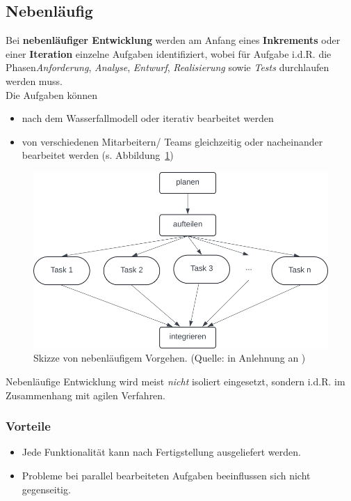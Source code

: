 \subsection{Nebenläufig}

\noindent
Bei \textbf{nebenläufiger Entwicklung} werden am Anfang eines \textbf{Inkrements} oder einer \textbf{Iteration} einzelne Aufgaben identifiziert, wobei für Aufgabe i.d.R. die Phasen\textit{Anforderung}, \textit{Analyse},  \textit{Entwurf}, \textit{Realisierung} sowie \textit{Tests} durchlaufen werden muss.\\
Die Aufgaben können
\begin{itemize}
    \item nach dem Wasserfallmodell oder iterativ bearbeitet werden
    \item von verschiedenen Mitarbeitern/ Teams gleichzeitig oder nacheinander bearbeitet werden (s. Abbildung~\ref{fig:nebenlaeufig})
\end{itemize}


\begin{figure}
    \centering
    \includegraphics[scale=0.4]{part one/Prozessmodelle/img/nebenlaeufigkeit}
    \caption{Skizze von nebenläufigem Vorgehen. (Quelle: in Anlehnung an \cite[29]{Wed09})}
    \label{fig:nebenlaeufig}
\end{figure}


\noindent
Nebenläufige Entwicklung wird meist \textit{nicht} isoliert eingesetzt, sondern i.d.R. im Zusammenhang mit agilen Verfahren.

\subsubsection*{Vorteile}

\begin{itemize}
    \item Jede Funktionalität kann nach Fertigstellung ausgeliefert werden.
    \item Probleme bei parallel bearbeiteten Aufgaben beeinflussen sich nicht gegenseitig.
\end{itemize}

